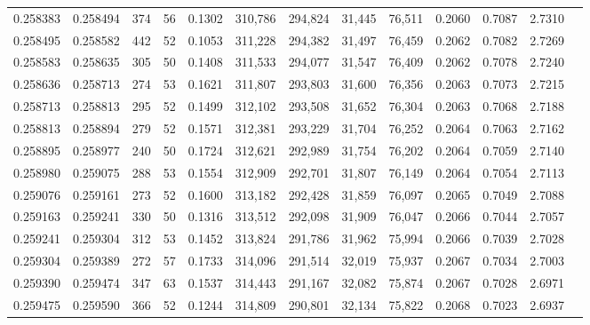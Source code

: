 \begin{tabular}{rrrrrrrrrrrrr}
0.258383 & 0.258494 &   374 &  56 &                                     0.1302 & 310,786 & 294,824 &  31,445 &  76,511 & 0.2060 & 0.7087 & 2.7310 \\
0.258495 & 0.258582 &   442 &  52 &                                     0.1053 & 311,228 & 294,382 &  31,497 &  76,459 & 0.2062 & 0.7082 & 2.7269 \\
0.258583 & 0.258635 &   305 &  50 &                                     0.1408 & 311,533 & 294,077 &  31,547 &  76,409 & 0.2062 & 0.7078 & 2.7240 \\
0.258636 & 0.258713 &   274 &  53 &                                     0.1621 & 311,807 & 293,803 &  31,600 &  76,356 & 0.2063 & 0.7073 & 2.7215 \\
0.258713 & 0.258813 &   295 &  52 &                                     0.1499 & 312,102 & 293,508 &  31,652 &  76,304 & 0.2063 & 0.7068 & 2.7188 \\
0.258813 & 0.258894 &   279 &  52 &                                     0.1571 & 312,381 & 293,229 &  31,704 &  76,252 & 0.2064 & 0.7063 & 2.7162 \\
0.258895 & 0.258977 &   240 &  50 &                                     0.1724 & 312,621 & 292,989 &  31,754 &  76,202 & 0.2064 & 0.7059 & 2.7140 \\
0.258980 & 0.259075 &   288 &  53 &                                     0.1554 & 312,909 & 292,701 &  31,807 &  76,149 & 0.2064 & 0.7054 & 2.7113 \\
0.259076 & 0.259161 &   273 &  52 &                                     0.1600 & 313,182 & 292,428 &  31,859 &  76,097 & 0.2065 & 0.7049 & 2.7088 \\
0.259163 & 0.259241 &   330 &  50 &                                     0.1316 & 313,512 & 292,098 &  31,909 &  76,047 & 0.2066 & 0.7044 & 2.7057 \\
0.259241 & 0.259304 &   312 &  53 &                                     0.1452 & 313,824 & 291,786 &  31,962 &  75,994 & 0.2066 & 0.7039 & 2.7028 \\
0.259304 & 0.259389 &   272 &  57 &                                     0.1733 & 314,096 & 291,514 &  32,019 &  75,937 & 0.2067 & 0.7034 & 2.7003 \\
0.259390 & 0.259474 &   347 &  63 &                                     0.1537 & 314,443 & 291,167 &  32,082 &  75,874 & 0.2067 & 0.7028 & 2.6971 \\
0.259475 & 0.259590 &   366 &  52 &                                     0.1244 & 314,809 & 290,801 &  32,134 &  75,822 & 0.2068 & 0.7023 & 2.6937 \\

\end{tabular}
